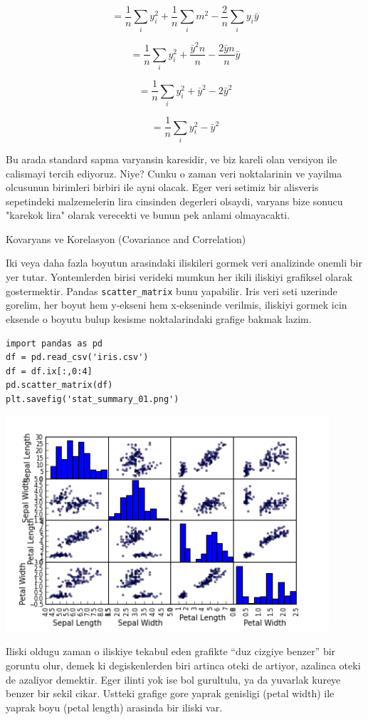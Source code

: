 \documentclass[12pt,fleqn]{article}\usepackage{../common}
\begin{document}
$$ = \frac{ 1}{n} \sum_i y_i^2 + \frac{ 1}{n} \sum_i m^2 - \frac{ 2}{n} \sum_i y_i\bar{y}  $$

$$ = \frac{ 1}{n} \sum_i y_i^2 + \frac{ \bar{y}^2n}{n} - \frac{ 2\bar{y}n}{n}\bar{y} $$

$$ = \frac{ 1}{n} \sum_i y_i^2 +  \bar{y}^2 - 2\bar{y}^2 $$

$$ = \frac{ 1}{n} \sum_i y_i^2 - \bar{y}^2 $$

Bu arada standard sapma varyansin karesidir, ve biz kareli olan versiyon
ile calismayi tercih ediyoruz. Niye? Cunku o zaman veri noktalarinin ve
yayilma olcusunun birimleri birbiri ile ayni olacak. Eger veri setimiz bir
alisveris sepetindeki malzemelerin lira cinsinden degerleri olsaydi,
varyans bize sonucu "karekok lira" olarak verecekti ve bunun pek anlami
olmayacakti.

Kovaryans ve Korelasyon (Covariance and Correlation)

Iki veya daha fazla boyutun arasindaki iliskileri gormek veri analizinde
onemli bir yer tutar. Yontemlerden birisi verideki mumkun her ikili
iliskiyi grafiksel olarak gostermektir. Pandas \verb!scatter_matrix! bunu
yapabilir. Iris veri seti uzerinde gorelim, her boyut hem y-ekseni hem
x-ekseninde verilmis, iliskiyi gormek icin eksende o boyutu bulup kesisme
noktalarindaki grafige bakmak lazim. 

\begin{verbatim}
import pandas as pd
df = pd.read_csv('iris.csv')
df = df.ix[:,0:4]
pd.scatter_matrix(df)
plt.savefig('stat_summary_01.png')
\end{verbatim}

\includegraphics[height=8cm]{stat_summary_01.png}


Iliski oldugu zaman o iliskiye tekabul eden grafikte ``duz cizgiye benzer''
bir goruntu olur, demek ki degiskenlerden biri artinca oteki de artiyor,
azalinca oteki de azaliyor demektir. Eger ilinti yok ise bol gurultulu, ya
da yuvarlak kureye benzer bir sekil cikar. Ustteki grafige gore yaprak
genisligi (petal width) ile yaprak boyu (petal length) arasinda bir iliski
var. 
\end{document}
